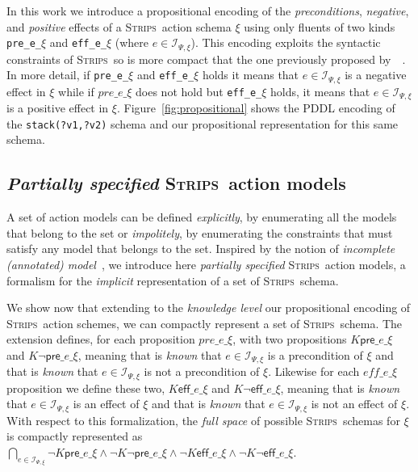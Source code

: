 \documentclass{article}
\newcommand{\pre}{\mathsf{pre}}     %
\newcommand{\eff}{\mathsf{eff}}     %
\newcommand{\strips}{\textsc{Strips}}
\begin{document}
In this work we introduce a propositional encoding of the {\em preconditions}, {\em negative}, and {\em positive} effects of a \strips\ action schema $\xi$ using only fluents of two kinds {\tt\small pre\_e\_$\xi$} and {\tt\small eff\_e\_$\xi$} (where $e\in{\mathcal I}_{\Psi,\xi}$). This encoding exploits the syntactic constraints of \strips\ so is more compact that the one previously proposed by~\citeauthor{aineto2018learning}~\citeyear{aineto2018learning}. In more detail, if {\tt\small pre\_e\_$\xi$} and {\tt\small eff\_e\_$\xi$} holds it means that $e\in{\mathcal I}_{\Psi,\xi}$ is a negative effect in $\xi$ while if $pre\_e\_\xi$ does not hold but {\tt\small eff\_e\_$\xi$} holds, it means that $e\in{\mathcal I}_{\Psi,\xi}$ is a positive effect in $\xi$. Figure~\ref{fig:propositional} shows the PDDL encoding of the {\tt\small stack(?v1,?v2)} schema and our propositional representation for this same schema. 

\subsection{{\em Partially specified} \strips\ action models}
A set of action models can be defined {\em explicitly}, by enumerating all the models that belong to the set or {\em impolitely}, by enumerating the constraints that must satisfy any model that belongs to the set. Inspired by the notion of {\em incomplete (annotated) model}~\cite{sreedharan2018handling}, we introduce here {\em partially specified} \strips\ action models, a formalism for the {\em implicit} representation of a set of \strips\ schema.

We show now that extending to the {\em knowledge level} our propositional encoding of \strips\ action schemes, we can compactly represent a set of \strips\ schema. The extension defines, for each proposition {\tt\small $pre\_e\_\xi$}, with two propositions {\tt\small $K\pre\_e\_\xi$} and {\tt\small $K\neg\pre\_e\_\xi$}, meaning that is {\em known} that $e\in{\mathcal I}_{\Psi,\xi}$ is a precondition of $\xi$ and that is {\em known} that $e\in{\mathcal I}_{\Psi,\xi}$ is not a precondition of $\xi$. Likewise for each {\tt\small $eff\_e\_\xi$} proposition we define these two, {\tt\small $K\eff\_e\_\xi$} and {\tt\small $K\neg\eff\_e\_\xi$}, meaning that is {\em known} that $e\in{\mathcal I}_{\Psi,\xi}$ is an effect of $\xi$ and that is {\em known} that $e\in{\mathcal I}_{\Psi,\xi}$ is not an effect of $\xi$. With respect to this formalization, the {\em full space} of possible \strips\ schemas for $\xi$ is compactly represented as {\tt\small $\bigcap_{e\in{\mathcal I}_{\Psi,\xi}} \neg K\pre\_e\_\xi\wedge \neg K\neg\pre\_e\_\xi \wedge\neg K\eff\_e\_\xi\wedge \neg K\neg\eff\_e\_\xi$}.
\end{document}
